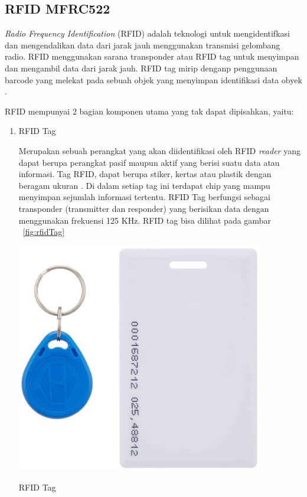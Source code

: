 \subsection{RFID MFRC522}
\textit{Radio Frequency Identification} (RFID) adalah teknologi untuk mengidentifkasi dan mengendalikan data dari jarak jauh menggunakan transmisi gelombang radio. RFID menggunakan sarana transponder atau RFID tag untuk menyimpan dan mengambil data dari jarak jauh. RFID tag mirip denganp penggunaan barcode yang melekat pada sebuah objek yang menyimpan identifikasi data obyek .

RFID mempunyai 2 bagian komponen utama yang tak dapat dipisahkan, yaitu:
\begin{enumerate}[topsep=0pt,itemsep=0pt,partopsep=0pt, parsep=0pt]
    \item RFID Tag
    
    Merupakan sebuah perangkat yang akan diidentifikasi oleh RFID \textit{reader} yang dapat berupa perangkat pasif maupun aktif yang berisi suatu data atau informasi. Tag RFID, dapat berupa stiker, kertas atau plastik dengan beragam ukuran . Di dalam setiap tag ini terdapat chip yang mampu menyimpan sejumlah informasi tertentu. RFID Tag berfungsi sebagai transponder (transmitter dan responder) yang berisikan data dengan menggunakan frekuensi 125 KHz. RFID tag bisa dilihat pada gambar ~\ref{fig:rfidTag} 

    \begin{afigure} 
        \includegraphics[width=0.85\textwidth, center]{images/rfidTag.jpg}
        \caption{RFID Tag}
        \label{fig:rfidTag}
    \end{afigure}


\end{enumerate}
